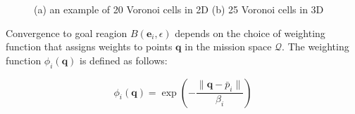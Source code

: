         \begin{figure}[H]
            \centering
            \caption{
                (a) an example of 20 Voronoi cells in 2D \cite{Voronoi2d} (b) 25 Voronoi cells in 3D \cite{Voronoi3d}
            }
            \label{fig:voronoi_diagrams}
        \end{figure}

        Convergence to goal reagion $B(\mathbf{e}_i, \epsilon)$ depends on the choice of weighting function that assigns weights to points $\mathbf{q}$ in the mission space $\mathcal{Q}$.
        The weighting function $\phi_i(\mathbf{q})$ is defined as follows: 

        \begin{equation}
            \phi_i(\mathbf{q}) = \exp\left(-\frac{\|\mathbf{q} - \bar{p}_i\|}{\beta_i}\right) \tag{7}
        \end{equation}
        
